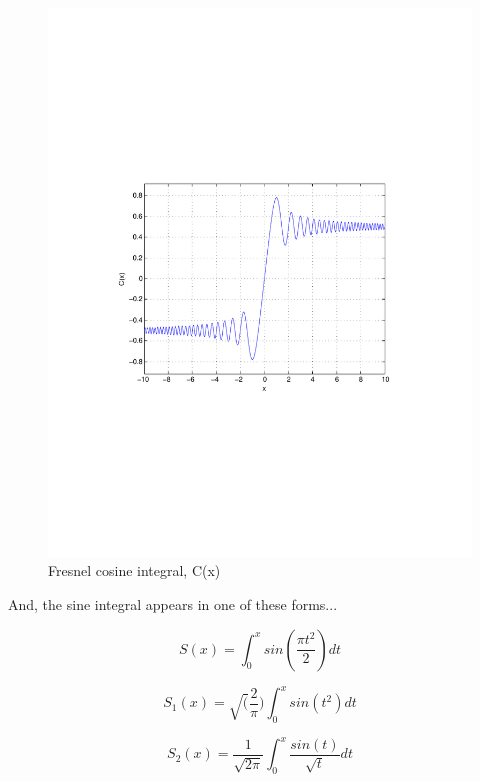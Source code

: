 \documentclass[a4paper,11pt]{article}
\begin{document}
\begin{figure}
\centering
    \includegraphics[width=5in]{C.pdf}
        \caption{Fresnel cosine integral, C(x)}
\end{figure}

And, the sine integral appears in one of these forms...

\begin{equation}
    S(x) = \int_0^x sin(\frac{\pi t^2}{2}) dt
\end{equation}

\begin{equation}
    S_1(x) = \sqrt(\frac{2}{\pi}) \int_0^x sin(t^2) dt
\end{equation}

\begin{equation}
    S_2(x) = \frac{1}{\sqrt{2 \pi}} \int_0^x \frac{sin(t)} {\sqrt{t}} dt
\end{equation}
\end{document}
